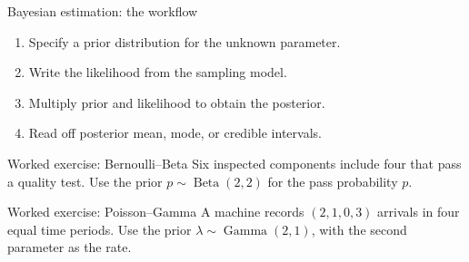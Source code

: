 \documentclass[aspectratio=169,11pt]{beamer}
\newcommand{\E}{\mathbb{E}}
\newcommand{\GammaDist}{\operatorname{Gamma}}
\begin{document}
\begin{frame}{Bayesian estimation: the workflow}
  \begin{enumerate}
    \item Specify a prior distribution for the unknown parameter.
    \item Write the likelihood from the sampling model.
    \item Multiply prior and likelihood to obtain the posterior.
    \item Read off posterior mean, mode, or credible intervals.
  \end{enumerate}


\end{frame}

\begin{frame}{Worked exercise: Bernoulli--Beta}
  Six inspected components include four that pass a quality test. Use the prior
  $p\sim\operatorname{Beta}(2,2)$ for the pass probability $p$.


  \uncover<3->{%
    \[
      \widehat p_{\mathrm{Bayes}}
      =\E[p\mid x]=\frac{6}{10}=0.600,
      \qquad
      \widehat p_{\mathrm{MAP}}=\frac{5}{8}=0.625.
    \]
  }

\end{frame}

\begin{frame}{Worked exercise: Poisson--Gamma}
  A machine records $(2,1,0,3)$ arrivals in four equal time periods. Use the
  prior $\lambda\sim\GammaDist(2,1)$, with the second parameter as the rate.

  \uncover<2->{%
    The total count is $t=6$, so
    \[
      \lambda\mid x\sim\GammaDist(2+6,1+4)=\GammaDist(8,5).
    \]
  }

  \uncover<3->{%
    \[
      \widehat\lambda_{\mathrm{Bayes}}
      =\E[\lambda\mid x]=\frac{8}{5}=1.60,
      \qquad
      \widehat\lambda_{\mathrm{MAP}}=\frac{7}{5}=1.40.
    \]
  }

\end{frame}
\end{document}
